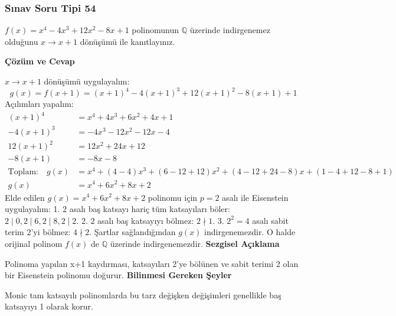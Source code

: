 \documentclass[11pt, a4paper]{article}
\newenvironment{cozum}{
    \vspace{0.5cm}
    \noindent\textcolor{green!60!black}{\faCheckCircle\enspace \textbf{\Large Çözüm ve Cevap}}\par\vspace{0.2cm}
}{}
\newenvironment{sezgisel}{
    \vspace{0.5cm}
    \noindent\textcolor{orange!80!black}{\faLightbulb\enspace \textbf{\Large Sezgisel Açıklama}}\par\vspace{0.2cm}
    \itshape
}{}
\newenvironment{bilgi}{
    \vspace{0.5cm}
    \noindent\textcolor{red!70!black}{\faExclamationTriangle\enspace \textbf{\Large Bilinmesi Gereken Şeyler}}\par\vspace{0.2cm}
}{}
\begin{document}
\subsubsection{Sınav Soru Tipi 54}
\begin{sinavbox}
$f(x) = x^4-4x^3+12x^2-8x+1$ polinomunun $\mathbb{Q}$ üzerinde indirgenemez olduğunu $x \to x+1$ dönüşümü ile kanıtlayınız.
\end{sinavbox}
\begin{cozum}
$x \to x+1$ dönüşümü uygulayalım:
\[ g(x) = f(x+1) = (x+1)^4 - 4(x+1)^3 + 12(x+1)^2 - 8(x+1) + 1 \]
Açılımları yapalım:
\begin{align*}
(x+1)^4 &= x^4 + 4x^3 + 6x^2 + 4x + 1 \\
-4(x+1)^3 &= -4x^3 - 12x^2 - 12x - 4 \\
12(x+1)^2 &= 12x^2 + 24x + 12 \\
-8(x+1) &= -8x - 8 \\
\text{Toplam:} \quad g(x) &= x^4 + (4-4)x^3 + (6-12+12)x^2 + (4-12+24-8)x + (1-4+12-8+1) \\
g(x) &= x^4 + 6x^2 + 8x + 2
\end{align*}
Elde edilen $g(x) = x^4+6x^2+8x+2$ polinomu için $p=2$ asalı ile Eisenstein uygulayalım:
1. $2$ asalı baş katsayı hariç tüm katsayıları böler: $2 \mid 0, 2 \mid 6, 2 \mid 8, 2 \mid 2$.
2. $2$ asalı baş katsayıyı bölmez: $2 \nmid 1$.
3. $2^2 = 4$ asalı sabit terim $2$'yi bölmez: $4 \nmid 2$.
Şartlar sağlandığından $g(x)$ indirgenemezdir. O halde orijinal polinom $f(x)$ de $\mathbb{Q}$ üzerinde indirgenemezdir.
\end{cozum}
\begin{sezgisel}
Polinoma yapılan x+1 kaydırması, katsayıları 2'ye bölünen ve sabit terimi 2 olan bir Eisenstein polinomu doğurur.
\end{sezgisel}
\begin{bilgi}
Monic tam katsayılı polinomlarda bu tarz değişken değişimleri genellikle baş katsayıyı 1 olarak korur.
\end{bilgi}

\newpage
\end{document}
